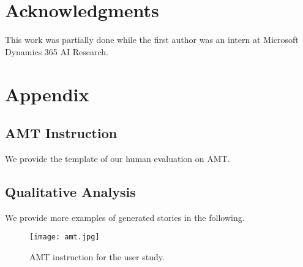\documentclass[letterpaper]{article} \usepackage{aaai20}  \usepackage{times}  \usepackage{helvet} \usepackage{courier}  \usepackage[hyphens]{url}  \usepackage{graphicx} \urlstyle{rm} \def\UrlFont{\rm}  \usepackage{graphicx}  \frenchspacing  \setlength{\pdfpagewidth}{8.5in}  \setlength{\pdfpageheight}{11in}  \usepackage{times}
\begin{document}
\section{Acknowledgments}
This work was partially done while the first author was an intern at Microsoft Dynamics 365 AI Research.




 \newpage
 \appendix

\section{Appendix}
     \subsection{AMT Instruction}
     We provide the template of our human evaluation on AMT.
     \subsection{Qualitative Analysis}
     We provide more examples of generated stories in the following.
    
 	\begin{figure}
 	    \centering
 		\texttt{[image: amt.jpg]}
 		\caption{AMT instruction for the user study. } \label{fig:amt}
 	\end{figure}
\end{document}
